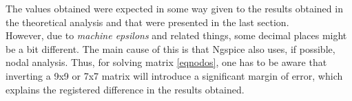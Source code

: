 \vspace{10px}

The values obtained were expected in some way given to the results obtained in the theoretical analysis and that were presented in the last section. \\

However, due to \textit{machine epsilons} and related things, some decimal places might be a bit different. The main cause of this is that Ngspice also uses, if possible, nodal analysis. Thus, for solving matrix \ref{eqnodos}, one has to be aware that inverting a 9x9 or 7x7 matrix will introduce a significant margin of error, which explains the registered difference in the results obtained.
